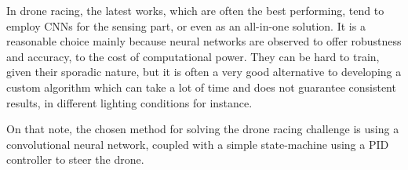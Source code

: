 In drone racing, the latest works, which are often the best performing, tend to
employ CNNs for the sensing part, or even as an all-in-one solution. It is a
reasonable choice mainly because neural networks are observed to offer
robustness and accuracy, to the cost of computational power. They can be hard
to train, given their sporadic nature, but it is often a very good alternative
to developing a custom algorithm which can take a lot of time and does not
guarantee consistent results, in different lighting conditions for instance.

On that note, the chosen method for solving the drone racing challenge is
using a convolutional neural network, coupled with a simple state-machine 
using a PID controller to steer the drone.
